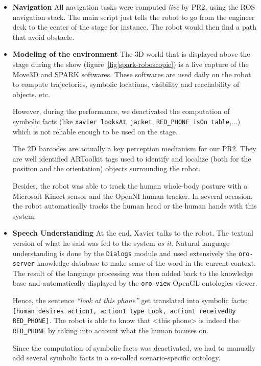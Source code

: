 \begin{itemize}
    \item{\bf Navigation} All navigation tasks were computed \emph{live} by
PR2, using the ROS navigation stack. The main script just tells the robot to go
from the engineer desk to the center of the stage for instance. The robot would
then find a path that avoid obstacle.  

    \item{\bf Modeling of the environment} The 3D world that is displayed above the stage
during the show (figure~\ref{fig|spark-roboscopie}) is a live capture of the
Move3D and SPARK softwares. These softwares are used daily on the robot to
compute trajectories, symbolic locations, visibility and reachability of
objects, etc.

However, during the performance, we deactivated the computation of symbolic
facts (like {\tt xavier looksAt jacket}, {\tt RED\_PHONE isOn table},...) which
is not reliable enough to be used on the stage.

The 2D barcodes are actually a key perception mechanism for our PR2. They are
well identified {\sc ARToolkit} tags used to identify and localize (both for the
position and the orientation) objects surrounding the robot.

Besides, the robot was able to track the human whole-body posture with a
Microsoft Kinect sensor and the {\sc OpenNI} human tracker. In several
occasion, the robot automatically tracks the human head or the human hands with
this system.

    \item{\bf Speech Understanding} At the end, Xavier talks to the robot. The
textual version of what he said was fed to the system \emph{as it}. Natural
language understanding is done by the {\tt Dialogs}
module and used extensively the {\tt oro-server} knowledge
database to make sense of the word in the current context. The result of the
language processing was then added back to the knowledge base and automatically
displayed by the {\tt oro-view} OpenGL ontologies viewer.

Hence, the sentence \emph{``look at this phone''} get translated into symbolic
facts: {\tt [human desires action1, action1 type Look, action1 receivedBy
RED\_PHONE]}. The robot is able to know that <this phone> is indeed the {\tt
RED\_PHONE} by taking into account what the human focuses on.

Since the computation of symbolic facts was deactivated, we had to manually add
several symbolic facts in a so-called scenario-specific ontology.

\end{itemize}

